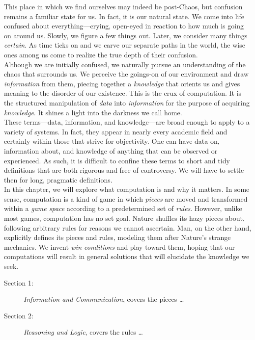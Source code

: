 This place in which we find ourselves may indeed be post-Chaos, but confusion remains a familiar state for us. In fact, it is our natural state. We come into life confused about everything---crying, open-eyed in reaction to how much is going on around us. Slowly, we figure a few things out. Later, we consider many things \textit{certain}. As time ticks on and we carve our separate paths in the world, the wise ones among us come to realize the true depth of their confusion. \\

Although we are initially confused, we naturally pursue an understanding of the chaos that surrounds us. We perceive the goings-on of our environment and draw \textit{information} from them, piecing together a \textit{knowledge} that orients us and gives meaning to the disorder of our existence. This is the crux of computation. It is the structured manipulation of \textit{data} into \textit{information} for the purpose of acquiring \textit{knowledge}. It shines a light into the darkness we call home. \\

These terms---data, information, and knowledge---are broad enough to apply to a variety of systems. In fact, they appear in nearly every academic field and certainly within those that strive for objectivity. One can have data on, information about, and knowledge of anything that can be observed or experienced. As such, it is difficult to confine these terms to short and tidy definitions that are both rigorous and free of controversy. We will have to settle then for long, pragmatic definitions. \\

In this chapter, we will explore what computation is and why it matters. In some sense, computation is a kind of game in which \textit{pieces} are moved and transformed within a \textit{game space} according to a predetermined set of \textit{rules}. However, unlike most games, computation has no set goal. Nature shuffles its hazy pieces about, following arbitrary rules for reasons we cannot ascertain. Man, on the other hand, explicitly defines its pieces and rules, modeling them after Nature's strange mechanics. We invent \textit{win conditions} and play toward them, hoping that our computations will result in general solutions that will elucidate the knowledge we seek. \\

\begin{description}
	\item[Section 1:] \textit{Information and Communication}, covers the pieces \dots
	\item[Section 2:] \textit{Reasoning and Logic}, covers the rules \dots \\
\end{description}


